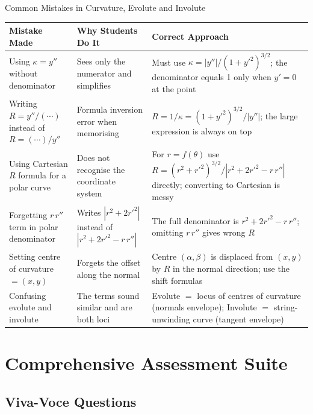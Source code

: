 \documentclass[12pt,a4paper]{article}
\begin{document}
\begin{mistakebox}{Common Mistakes in Curvature, Evolute and Involute}
\begin{tabular}{@{}p{4cm} p{4cm} p{6cm}@{}}
\toprule
\textbf{Mistake Made} & \textbf{Why Students Do It} & \textbf{Correct Approach} \\
\midrule
Using $\kappa = y''$ without denominator &
Sees only the numerator and simplifies &
Must use $\kappa = |y''|/(1+y'^{2})^{3/2}$; the denominator equals 1 only when $y'=0$ at the point \\[6pt]
Writing $R = y''/(\cdots)$ instead of $R = (\cdots)/y''$ &
Formula inversion error when memorising &
$R = 1/\kappa = (1+y'^{2})^{3/2}/|y''|$; the large expression is always on top \\[6pt]
Using Cartesian $R$ formula for a polar curve &
Does not recognise the coordinate system &
For $r=f(\theta)$ use $R=(r^{2}+r'^{2})^{3/2}/|r^{2}+2r'^{2}-r\,r''|$ directly; converting to Cartesian is messy \\[6pt]
Forgetting $r\,r''$ term in polar denominator &
Writes $|r^{2}+2r'^{2}|$ instead of $|r^{2}+2r'^{2}-r\,r''|$ &
The full denominator is $r^{2}+2r'^{2}-r\,r''$; omitting $r\,r''$ gives wrong $R$ \\[6pt]
Setting centre of curvature $= (x,y)$ &
Forgets the offset along the normal &
Centre $(\alpha,\beta)$ is displaced from $(x,y)$ by $R$ in the normal direction; use the shift formulas \\[6pt]
Confusing evolute and involute &
The terms sound similar and are both loci &
Evolute $=$ locus of centres of curvature (normals envelope); Involute $=$ string-unwinding curve (tangent envelope) \\
\bottomrule
\end{tabular}
\end{mistakebox}

\section{Comprehensive Assessment Suite}

\subsection*{Viva-Voce Questions}
\end{document}
